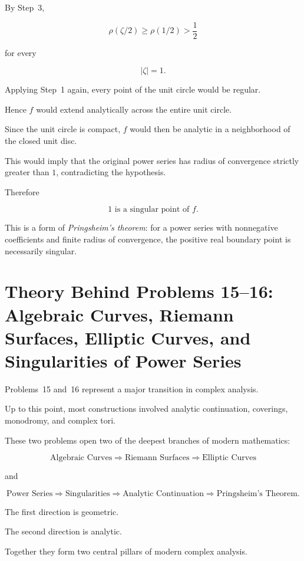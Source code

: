\documentclass[12pt,a4paper]{article}
\theoremstyle{notespace}
\begin{document}
By Step~3,

\[
\rho(\zeta/2)
\ge
\rho(1/2)
>
\frac12
\]

for every

\[
|\zeta|=1.
\]

Applying Step~1 again, every point of the unit circle would be regular.

Hence \(f\) would extend analytically across the entire unit circle.

Since the unit circle is compact, \(f\) would then be analytic in a neighborhood of the closed unit disc.

This would imply that the original power series has radius of convergence strictly greater than \(1\), contradicting the hypothesis.

Therefore

\[
\boxed{
	1
	\text{ is a singular point of }f.
}
\]

This is a form of \emph{Pringsheim's theorem}: for a power series with nonnegative coefficients and finite radius of convergence, the positive real boundary point is necessarily singular.
	
	
\section{Theory Behind Problems 15--16:
	Algebraic Curves, Riemann Surfaces, Elliptic Curves, and Singularities of Power Series}

Problems~15 and~16 represent a major transition in complex analysis.

Up to this point, most constructions involved analytic continuation, coverings, monodromy, and complex tori.

These two problems open two of the deepest branches of modern mathematics:

\[
\boxed{
	\text{Algebraic Curves}
	\Longrightarrow
	\text{Riemann Surfaces}
	\Longrightarrow
	\text{Elliptic Curves}
}
\]

and

\[
\boxed{
	\text{Power Series}
	\Longrightarrow
	\text{Singularities}
	\Longrightarrow
	\text{Analytic Continuation}
	\Longrightarrow
	\text{Pringsheim's Theorem}.
}
\]

The first direction is geometric.

The second direction is analytic.

Together they form two central pillars of modern complex analysis.

\bigskip
\end{document}

